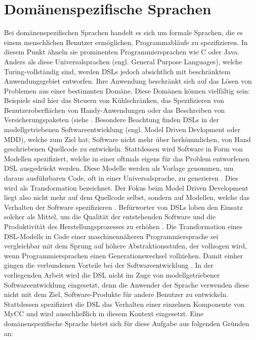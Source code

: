 \section{Domänenspezifische Sprachen}
Bei domänenspezifischen Sprachen handelt es sich um formale Sprachen, die es einem menschlichen Benutzer ermöglichen, Programmabläufe zu spezifizieren. In diesem Punkt ähneln sie prominenten Programmiersprachen wie C oder Java. Anders als diese Universalsprachen (engl. General Purpose Languages), welche Turing-vollständig sind, werden DSLs jedoch absichtlich mit beschränktem Anwendungsgebiet entworfen. Ihre Anwendung beschränkt sich auf das Lösen von Problemen aus einer bestimmten Domäne. Diese Domänen können vielfältig sein: Beispiele sind hier das Steuern von Kühlschränken, das Spezifizieren von Benutzeroberflächen von Handy-Anwendungen oder das Beschreiben von Versicherungspaketen (siehe \cite[S. 93ff.]{Kelly:08}. Besondere Beachtung finden DSLs in der modellgetriebenen Softwareentwicklung (engl. Model Driven Devlopment oder MDD), welche zum Ziel hat, Software nicht mehr über herkömmlichen, von Hand geschriebenen Quellcode zu entwickeln. Stattdessen wird Software in Form von Modellen spezifiziert, welche in einer oftmals eigens für das Problem entworfenen DSL ausgedrückt werden. Diese Modelle werden als Vorlage genommen, um daraus ausführbaren Code, oft in einer  Universalsprache, zu generieren \cite[S. 29]{Voelter:13}. Dies wird als Transformation bezeichnet. Der Fokus beim Model Driven Development liegt also nicht mehr auf dem Quellcode selbst, sondern auf Modellen, welche das Verhalten der Software spezifizieren \cite[S. 3]{Kleppe:09}. Befürworter von DSLs loben den Einsatz solcher als Mittel, um die Qualität der entstehenden Software und die Produktivität des Herstellungsprozesses zu erhöhen \cite[S. 33f]{Fowler:11}. Die Transformation eines DSL-Modells in Code einer maschinennäheren Programmiersprache sei vergleichbar mit dem Sprung auf höhere Abstraktionsstufen, der vollzogen wird, wenn Programmiersprachen einen Generationswechsel vollziehen. Damit einher gingen die verbundenen Vorteile bei der Softwareentwicklung \cite[S. 15ff]{Kelly:08}.
\newline
In der vorliegenden Arbeit wird die DSL nicht im Zuge von modellgetriebener Softwareentwicklung eingesetzt, denn die Anwender der Sprache verwenden diese nicht mit dem Ziel, Software-Produkte für andere Benutzer zu entwickeln. Stattdessen spezifiziert die DSL das Verhalten einer einzelnen Komponente von MyCC und wird ausschließlich in diesem Kontext eingesetzt. Eine domänenspezifische Sprache bietet sich für diese Aufgabe aus folgenden Gründen an: 
